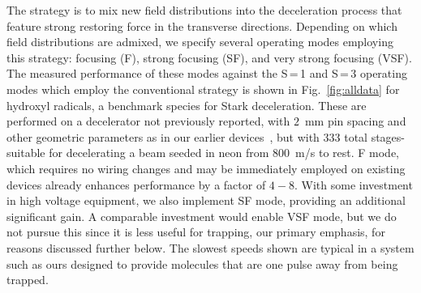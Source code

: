 \documentclass[%
 reprint,
 amsmath,amssymb,
 aps,
prl,
]{revtex4-1}
\begin{document}
The strategy is to mix new field distributions into the deceleration process that feature strong restoring force in the transverse directions.
Depending on which field distributions are admixed, we specify several operating modes employing this strategy: focusing (F), strong focusing (SF), and very strong focusing (VSF).
The measured performance of these modes against the S\,=\,1 and S\,=\,3 operating modes which employ the conventional strategy is shown in Fig.~\ref{fig:alldata} for hydroxyl radicals, a benchmark species for Stark deceleration.
These are performed on a decelerator not previously reported, with $2$~mm pin spacing and other geometric parameters as in our earlier devices~\cite{}, but with $333$ total stages- suitable for decelerating a beam seeded in neon from $800$~m/s to rest.
F mode, which requires no wiring changes and may be immediately employed on existing devices already enhances performance by a factor of $4-8$.
With some investment in high voltage equipment, we also implement SF mode, providing an additional significant gain. %
A comparable investment would enable VSF mode, but we do not pursue this since it is less useful for trapping, our primary emphasis, for reasons discussed further below.
The slowest speeds shown are typical in a system such as ours designed to provide molecules that are one pulse away from being trapped.


\end{document}
